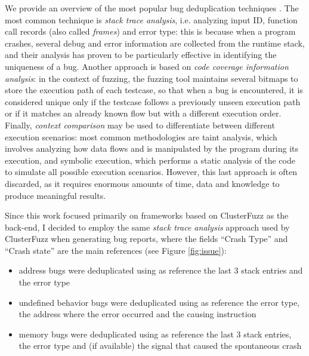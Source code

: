 We provide an overview of the most popular bug deduplication techniques \cite{dedup_survey}.
The most common technique is \textit{stack trace analysis}, i.e. analyzing input ID, function call records (also called \textit{frames}) and error type: this is because when a program crashes, several debug and error information are collected from the runtime stack, and their analysis has proven to be particularly effective in identifying the uniqueness of a bug.
Another approach is based on \textit{code coverage information analysis}: in the context of fuzzing, the fuzzing tool maintains several bitmaps to store the execution path of each testcase, so that when a bug is encountered, it is considered unique only if the testcase follows a previously unseen execution path or if it matches an already known flow but with a different execution order.
Finally, \textit{context comparison} may be used to differentiate between different execution scenarios: most common methodologies are taint analysis, which involves analyzing how data flows and is manipulated by the program during its execution, and symbolic execution, which performs a static analysis of the code to simulate all possible execution scenarios. However, this last approach is often discarded, as it requires enormous amounts of time, data and knowledge to produce meaningful results.
\newline

Since this work focused primarily on frameworks based on ClusterFuzz as the back-end, I decided to employ the same \textit{stack trace analysis} approach used by ClusterFuzz when generating bug reports, where the fields ``Crash Type'' and ``Crash state'' are the main references (see Figure \ref{fig:issue}):
\begin{itemize}
    \item address bugs were deduplicated using as reference the last 3 stack entries and the error type
    \item undefined behavior bugs were deduplicated using as reference the error type, the address where the error occurred and the causing instruction
    \item memory bugs were deduplicated using as reference the last 3 stack entries, the error type and (if available) the signal that caused the spontaneous crash
\end{itemize}